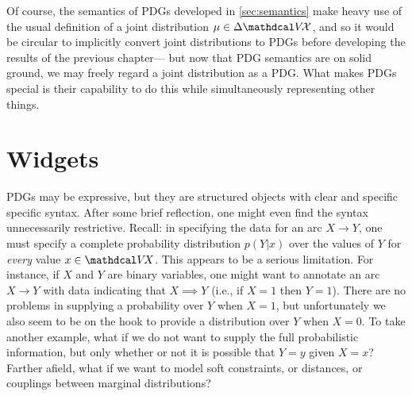 Of course, the semantics of PDGs developed in \cref{sec:semantics}
make heavy use of the usual definition of a joint distribution $\mu \in \Delta \V\!\X$, and so it would be circular to implicitly convert joint distributions to PDGs before developing the results of the previous chapter---%
but now that PDG semantics are on solid ground, we may freely regard a joint distribution as a PDG. 
What makes PDGs special is their capability to do this while simultaneously representing other things. 


\section{Widgets}
    \label{sec:widgets}

PDGs may be expressive, but they are structured objects with clear and specific specific syntax.
After some brief reflection, one might even find the syntax unnecessarily restrictive. 
Recall: in specifying the data for an arc $X \to Y$, one must specify a complete probability distribution $p(Y | x)$ over the values of $Y$ for \emph{every} value $x \in \V\!X$. 
This appears to be a serious limitation.
For instance, if $X$ and $Y$ are binary variables, one might want to 
annotate an arc $X \to Y$ with data indicating that $X \implies Y$
    (i.e., if $X=1$ then $Y=1$).
There are no problems in supplying a probability over $Y$ when $X{=}1$,
but unfortunately we also seem to be on the hook to provide
    a distribution over $Y$ when $X{=}0$. 
To take another example, what if we do not want to supply the full probabilistic information, but only whether or not it is possible that $Y{=}y$ given $X{=}x$? 
Farther afield, what if we want to model soft constraints, or distances, or couplings between marginal distributions?

